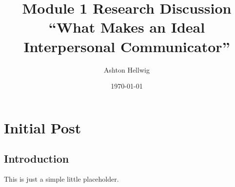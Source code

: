 \documentclass[12pt]{apa7}
\title{%
    Module 1 Research Discussion\\%
    ``What Makes an Ideal Interpersonal Communicator''
  }
\author{Ashton Hellwig}
\date{\today}
\begin{document}
  \maketitle
  \newpage

  \section{Initial Post}
    \subsection{Introduction}
      This is just a simple little placeholder.


\end{document}
